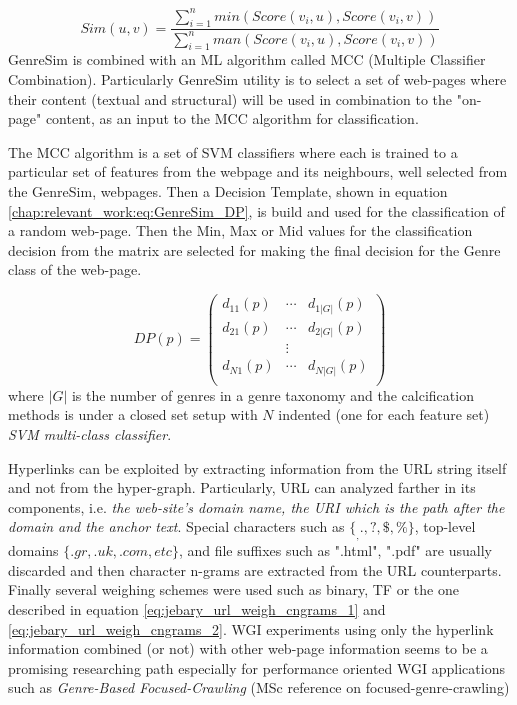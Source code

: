 \begin{equation}\label{eq:GenreSim_Selection_Score}
	Sim(u, v) = \frac{\sum_{i=1}^{n} min(Score(v_{i}, u), Score(v_{i}, v))}{\sum_{i=1}^{n} man(Score(v_{i}, u), Score(v_{i}, v))}
\end{equation}
GenreSim is combined with an ML algorithm called MCC (Multiple Classifier Combination). Particularly GenreSim utility is to select a set of web-pages where their content (textual and structural) will be used in combination to the "on-page" content, as an input to the MCC algorithm for classification.

The MCC algorithm is a set of SVM classifiers where each is trained to a particular set of features from the webpage and its neighbours, well selected from the GenreSim, webpages. Then a Decision Template, shown in equation \ref{chap:relevant_work:eq:GenreSim_DP}, is build and used for the classification of a random web-page. Then the Min, Max or Mid values for the classification decision from the matrix are selected for making the final decision for the Genre class of the web-page.

\begin{equation}\label{chap:relevant_work:eq:GenreSim_DP}
	DP(p) = \left(
    	\begin{array}{ccc}
        	d_{11} (p) & \cdots & d_{1|G|} (p) \\
            d_{21} (p) & \cdots  & d_{2|G|} (p) \\
            & \vdots & \\
            d_{N1} (p) & \cdots  & d_{N|G|} (p) \\
         \end{array}
\right)
\end{equation}
\noindent
where $|G|$ is the number of genres in a genre taxonomy and the calcification methods is under a closed set setup with $N$ indented (one for each feature set) \textit{SVM multi-class classifier}. 

Hyperlinks can be exploited by extracting information from the URL string itself and not from the hyper-graph. Particularly, URL can analyzed farther in its components, i.e. \textit{the web-site's domain name, the URI which is the path after the domain and the anchor text}. Special characters such as $\{_ , . , ?, \$ , \%\}$, top-level domains $\{.gr , .uk , .com, etc\}$, and file suffixes such as ".html", ".pdf" are usually discarded and then character n-grams are extracted from the URL counterparts. Finally several weighing schemes were used such as binary, TF or the one described in equation \ref{eq:jebary_url_weigh_cngrams_1} and \ref{eq:jebary_url_weigh_cngrams_2}. WGI experiments using only the hyperlink information combined (or not) with other web-page information seems to be a promising researching path especially for performance oriented WGI applications such as \textit{Genre-Based Focused-Crawling} \parencite{jebari2014pure_URL,jebari2015combination} (MSc reference on focused-genre-crawling)

